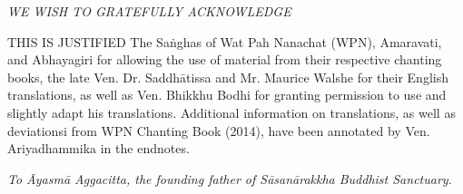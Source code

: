 \cleartorecto
\thispagestyle{empty}

\mbox{}\vfill

{\centering\itshape
WE WISH TO GRATEFULLY ACKNOWLEDGE
}

THIS IS JUSTIFIED
The Saṅghas of Wat Pah Nanachat (WPN), Amaravati, and Abhayagiri for allowing the use of material from their respective chanting books, the late Ven. Dr. Saddhātissa and Mr. Maurice Walshe for their English translations, as well as Ven. Bhikkhu Bodhi for granting permission to use and slightly adapt his translations.
Additional information on translations, as well as deviationsi from WPN Chanting Book (2014), have been annotated by Ven. Ariyadhammika in the endnotes.

{\centering\itshape
To Āyasmā Aggacitta, the founding father of
Sāsanārakkha Buddhist Sanctuary.
}

\vfill\mbox{}

\vspace*{5\baselineskip}
